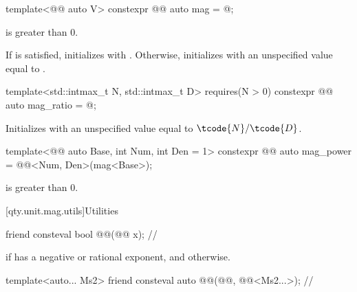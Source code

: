 \begin{itemdecl}
template<@@ auto V>
constexpr @@ auto mag = @\seebelownc@;
\end{itemdecl}

\begin{itemdescr}
\pnum
\constraints
{} is greater than $0$.

\pnum
\effects
If  is satisfied,
initializes  with .
Otherwise, initializes  with
an unspecified value equal to .
\end{itemdescr}

\begin{itemdecl}
template<std::intmax_t N, std::intmax_t D>
  requires(N > 0)
constexpr @@ auto mag_ratio = @\seebelownc@;
\end{itemdecl}

\begin{itemdescr}
\pnum
\effects
Initializes  with
an unspecified value equal to $\tcode{N}/\tcode{D}$.
\end{itemdescr}

\begin{itemdecl}
template<@@ auto Base, int Num, int Den = 1>
constexpr @@ auto mag_power = @@<Num, Den>(mag<Base>);
\end{itemdecl}

\begin{itemdescr}
\pnum
\constraints
{} is greater than $0$.
\end{itemdescr}

[qty.unit.mag.utils]{Utilities}

\begin{itemdecl}
friend consteval bool @@(@@ x);              // \expos
\end{itemdecl}

\begin{itemdescr}
\pnum
\returns
{} if  has a negative or rational exponent, and
 otherwise.
\end{itemdescr}

\begin{itemdecl}
template<auto... Ms2>
friend consteval auto @@(@@, @@<Ms2...>);  // \expos
\end{itemdecl}

